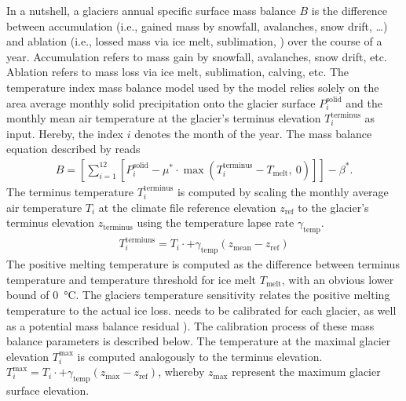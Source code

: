         In a nutshell, a glaciers annual specific surface mass balance $B$ is the difference between accumulation (i.e., gained mass by snowfall, avalanches, snow drift, \ldots) and ablation (i.e., lossed mass via ice melt, sublimation, ) over the course of a year. Accumulation refers to mass gain by snowfall, avalanches, snow drift, etc. Ablation refers to mass loss via ice melt, sublimation, calving, etc. The temperature index mass balance model used by the \vas{} model relies solely on the area average monthly solid precipitation onto the glacier surface $P_i^\text{solid}$ and the monthly mean air temperature at the glacier's terminus elevation $T_i^\text{terminus}$ as input. Hereby, the index $i$ denotes the month of the year. The mass balance equation described by \citet{Marzeion2012b} reads
        \begin{align}
            \label{eq:mass-balance}
            B = \left[\sum_{i=1}^{12}\left[
                    P_i^\text{solid}  - \mu^* \cdot \max\left(T_{i}^\text{terminus} - T_\text{melt},\ 0\right)
                \right]\right] - \beta^*.
        \end{align}
        The terminus temperature $T_{i}^\text{terminus}$ is computed by scaling the monthly average air temperature $T_i$ at the climate file reference elevation $z_\text{ref}$ to the glacier's terminus elevation $z_\text{terminus}$ using the temperature lapse rate $\gamma_\text{temp}$.
        \begin{align}
            T_i^\text{termiuns} = T_i \cdot + \gamma_\text{temp} (z_\text{mean} - z_\text{ref})
        \end{align}
        The positive melting temperature is computed as the difference between terminus temperature and temperature threshold for ice melt $T_\text{melt}$, with an obvious lower bound of \SI{0}{\celsius}. The glaciers temperature sensitivity \mustar{} relates the positive melting temperature to the actual ice loss. \mustar needs to be calibrated for each glacier, as well as a potential mass balance residual \bias{}). The calibration process of these mass balance parameters is described below. The temperature at the maximal glacier elevation $T_{i}^\text{max}$ is computed analogously to the terminus elevation. $T_{i}^\text{max} = T_i \cdot + \gamma_\text{temp} (z_\text{max} - z_\text{ref})$, whereby $z_\text{max}$ represent the maximum glacier surface elevation.
        
